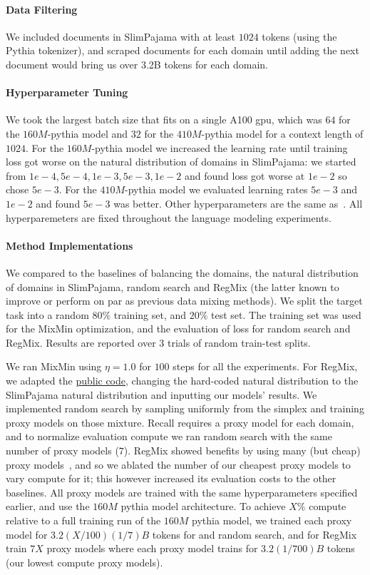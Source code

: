 \paragraph{Data Filtering} We included documents in SlimPajama with at least $1024$ tokens (using the Pythia tokenizer), and scraped documents for each domain until adding the next document would bring us over 3.2B tokens for each domain. 

\paragraph{Hyperparameter Tuning} We took the largest batch size that fits on a single A100 gpu, which was $64$ for the $160M$-pythia model and $32$ for the $410M$-pythia model for a context length of $1024$. For the $160M$-pythia model we increased the learning rate until training loss got worse on the natural distribution of domains in SlimPajama: we started from $1e-4, 5e-4,1e-3,5e-3,1e-2$ and found loss got worse at $1e-2$ so chose $5e-3$. For the $410M$-pythia model we evaluated learning rates $5e-3$ and $1e-2$ and found $5e-3$ was better. Other hyperparameters are the same as~\citep{thrush2024improving}. All hyperparemeters are fixed throughout the language modeling experiments.

\paragraph{Method Implementations} We compared \method to the baselines of balancing the domains, the natural distribution of domains in SlimPajama, random search and RegMix (the latter known to improve or perform on par as previous data mixing methods). We split the target task into a random $80\%$ training set, and $20\%$ test set. The training set was used for the MixMin optimization, and the evaluation of loss for random search and RegMix. Results are reported over $3$ trials of random train-test splits. 

We ran MixMin using $\eta = 1.0$ for $100$ steps for all the experiments. For RegMix, we adapted the \href{https://github.com/sail-sg/regmix/blob/main/regression_fitting/regression.ipynb}{public code}, changing the hard-coded natural distribution to the SlimPajama natural distribution and inputting our models' results. We implemented random search by sampling uniformly from the simplex and training proxy models on those mixture. Recall \method requires a proxy model for each domain, and to normalize evaluation compute we ran random search with the same number of proxy models ($7$). RegMix showed benefits by using many (but cheap) proxy models~\citep{liu2024regmix}, and so we ablated the number of our cheapest proxy models to vary compute for it; this however increased its evaluation costs to the other baselines. All proxy models are trained with the same hyperparameters specified earlier, and use the $160M$ pythia model architecture. To achieve $X\%$ compute relative to a full training run of the $160M$ pythia model, we trained each proxy model for $3.2 (X/100)(1/7)B$ tokens for \method and random search, and for RegMix train $7X$ proxy models where each proxy model trains for $3.2(1/700)B$ tokens (our lowest compute proxy models).




